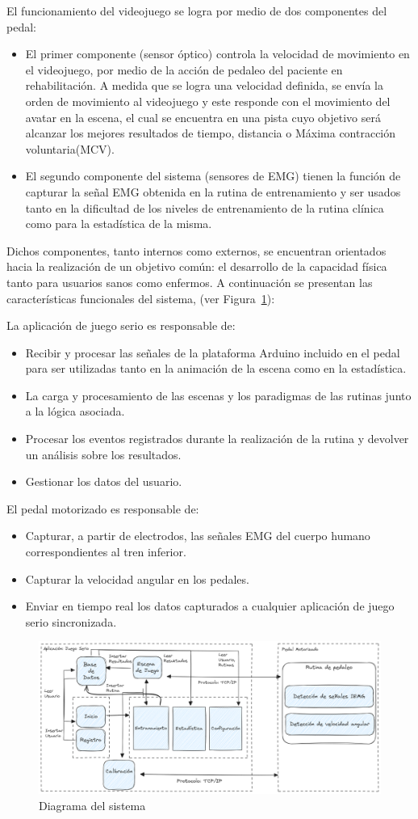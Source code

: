 El funcionamiento del videojuego se logra por medio de dos componentes del pedal:
\begin{itemize}
    \item El primer componente (sensor óptico) controla la velocidad de movimiento en el videojuego, por  medio de la acción de pedaleo del paciente en rehabilitación. A medida que se logra una velocidad definida, se envía la orden de movimiento al videojuego y este responde con el movimiento del avatar en la escena, el cual se encuentra en una pista cuyo objetivo será alcanzar los mejores resultados de tiempo, distancia o  Máxima contracción voluntaria(MCV).
    \item El segundo componente del sistema (sensores de EMG) tienen la función de capturar la señal EMG obtenida en la rutina de entrenamiento y ser usados tanto en la dificultad de los niveles de entrenamiento de la rutina clínica como para la estadística de la misma.
\end{itemize}
    
Dichos componentes, tanto internos como externos, se encuentran orientados hacia  la realización de un objetivo común: el desarrollo de la capacidad física tanto para usuarios sanos como enfermos. A continuación se presentan las características funcionales del sistema, (ver Figura~\ref{fig: system}):

La aplicación de juego serio es responsable de:
\begin{itemize}
    \item Recibir y procesar las señales de la plataforma Arduino incluido en el pedal para ser utilizadas tanto en la animación de la escena como en la estadística.
    \item La carga y procesamiento de las escenas y los paradigmas de las rutinas junto a la lógica asociada. 
    \item Procesar los eventos registrados durante la realización de la rutina y devolver un análisis sobre los resultados.
    \item Gestionar los datos del usuario.
\end{itemize}

El pedal motorizado es responsable de:
\begin{itemize}
    \item Capturar, a partir de electrodos, las señales EMG del cuerpo humano correspondientes al tren inferior.
    \item Capturar la velocidad angular en los pedales.
    \item Enviar en tiempo real los datos capturados a cualquier aplicación de juego serio sincronizada.
\end{itemize}
    
\begin{figure}[ht]
    \centering
    \includegraphics[scale=0.3]{images/system.png}
    \caption{Diagrama del sistema}
    \label{fig: system}
\end{figure}